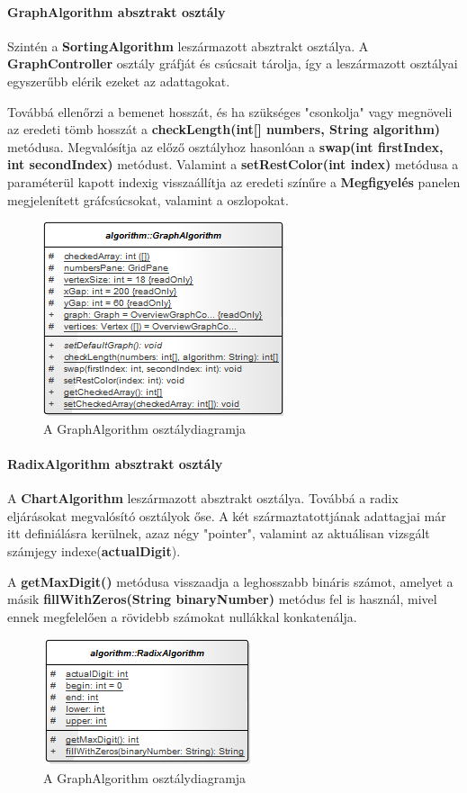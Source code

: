 \documentclass{elteikthesis}
\begin{document}
\paragraph{GraphAlgorithm absztrakt osztály}
Szintén a \textbf{SortingAlgorithm} leszármazott absztrakt osztálya. A \textbf{GraphController} osztály gráfját és csúcsait tárolja, így a leszármazott osztályai egyszerűbb elérik ezeket az adattagokat.\par
Továbbá ellenőrzi a bemenet hosszát, és ha szükséges "csonkolja" vagy megnöveli az eredeti tömb hosszát a \textbf{checkLength(int[] numbers, String algorithm)} metódusa. Megvalósítja az előző osztályhoz hasonlóan a \textbf{swap(int firstIndex, int secondIndex)} metódust. Valamint a \textbf{setRestColor(int index)} metódusa a paraméterül kapott indexig visszaállítja az eredeti színűre a \textbf{Megfigyelés} panelen megjelenített gráfcsúcsokat, valamint a oszlopokat.
\begin{figure}[H]
	\centering
	\includegraphics{pics/class/GraphAlgorithm.png}
	\caption{A GraphAlgorithm osztálydiagramja}
\end{figure}
\paragraph{RadixAlgorithm absztrakt osztály}
A \textbf{ChartAlgorithm} leszármazott absztrakt osztálya. Továbbá a radix eljárásokat megvalósító osztályok őse. A két származtatottjának adattagjai már itt definiálásra kerülnek, azaz négy "pointer", valamint az aktuálisan vizsgált számjegy indexe(\textbf{actualDigit}).\par
A \textbf{getMaxDigit()} metódusa visszaadja a leghosszabb bináris számot, amelyet a másik \textbf{fillWithZeros(String binaryNumber)} metódus fel is használ, mivel ennek megfelelően a rövidebb számokat nullákkal konkatenálja.
\begin{figure}[H]
	\centering
	\includegraphics{pics/class/RadixAlgorithm.png}
	\caption{A GraphAlgorithm osztálydiagramja}
\end{figure}
\end{document}
